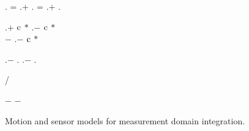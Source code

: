 \begin{figure}[tp]
\begin{algorithm}[H]
{        \BlankLine
        \sv \assign \observation.\sv\;
        \clockDrift = \samplex.\clockDrift + \samplex.\residualDrift{\sv}\;
        \clockOffset = \samplex.\clockOffset + \samplex.\residualOffset{\sv}\;

        \BlankLine
        \pseudorange \assign \observation.\pseudorange \(+\) \(\mathrm{c}\) \(*\) \sv.\clockOffset \(-\) \(\mathrm{c}\) \(*\) \clockOffset\\
            \hspace{1em} \(-\) \delays{\sv, \samplex}\;
        \velocity \assign \observation.\velocity \(-\) \(\mathrm{c}\) \(*\) \clockDrift\;

        \BlankLine
        \userToSv \assign \sv.\position \(-\) \samplex.\position\;
        \relativeVelocity \assign \sv.\velocity \(-\) \samplex.\velocity\;

        \geomRange \assign \abs{\userToSv}\;
        \geomVelocity \assign \dotProduct{\relativeVelocity, \userToSv} / \geomRange\;

        \BlankLine
        \rangeError \assign \pseudorange \(-\) \geomRange\;
        \uIf{\abs{\rangeError} \(<\) \SI{\pseudorangeThreshold}{\meter}}{
            \result \assign \normpdf{\rangeError, \(\mu\) = \num{\pseudorangeErrorMu}, \(\sigma\) = \num{\pseudorangeErrorSigma}}\;
        }
        \Else{
            \result \assign \num{\pseudorangeThresholdProbability}
        }
        \velocityError \assign \velocity \(-\) \geomVelocity\;
        \uIf{\abs{\velocityError} \(<\) \SI{\velocityThreshold}{\meter\per\second}}{
            \result \assign \result \(*\) \normpdf{\velocityError, \(\mu\) = \num{\velocityErrorMu}, \(\sigma\) = \num{\velocityErrorSigma}}\;
        }
        \Else{
            \result \assign \result \(*\) \num{\velocityThresholdProbability}
        }
        \Return \result\;
    }
\end{algorithm}
\caption{Motion and sensor models for measurement domain integration.}
\label{algo:gps-measurement-domain}
\end{figure}


